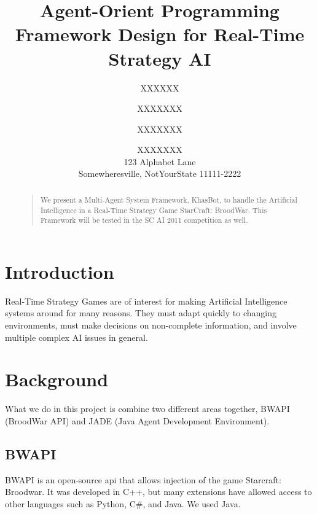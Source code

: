 \documentclass[letterpaper]{article}
\begin{document}
%
\title{Agent-Orient Programming Framework Design for Real-Time Strategy AI}


\author{XXXXXX \and XXXXXXX \and XXXXXXX \and XXXXXXX \\
123 Alphabet Lane \\  Somewheresville, NotYourState 11111-2222
}

\maketitle
\begin{abstract}
\begin{quote}
We present a Multi-Agent System Framework, KhasBot, to handle the Artificial Intelligence in a Real-Time Strategy Game StarCraft: BroodWar.  This Framework will be tested in the SC AI 2011 competition as well.
\end{quote}
\end{abstract}

\section{Introduction}
Real-Time Strategy Games are of interest for making Artificial Intelligence systems around for many reasons.  They must adapt quickly to changing environments, must make decisions on non-complete information, and involve multiple complex AI issues in general.

\section{Background}
What we do in this project is combine two different areas together, BWAPI (BroodWar API) and JADE (Java Agent Development Environment).

\subsection{BWAPI}
BWAPI is an open-source api that allows injection of the game Starcraft: Broodwar.  It was developed in C++, but many extensions have allowed access to other languages such as Python, C\#, and Java.  We used Java.
\end{document}
